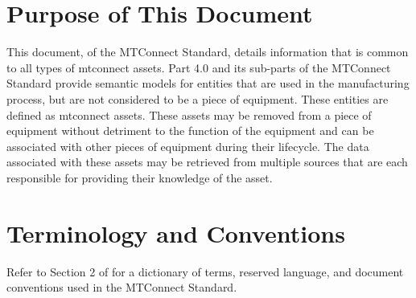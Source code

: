 \section{Purpose of This Document}

This document,  of the MTConnect Standard, details information that is common to all types of \glspl{mtconnect asset}.  Part 4.0 and its sub-parts of the MTConnect Standard provide semantic models for entities that are used in the manufacturing process, but are not considered to be a piece of equipment.  These entities are defined as \glspl{mtconnect asset}.  These \glspl{asset} may be removed from a piece of equipment without detriment to the function of the equipment and can be associated with other pieces of equipment during their lifecycle.  The data associated with these \glspl{asset} may be retrieved from multiple sources that are each responsible for providing their knowledge of the \gls{asset}.

\section{Terminology and Conventions}
Refer to Section 2 of  for a dictionary of terms, reserved language, and document conventions used in the MTConnect Standard.

\printglossary

\printacronyms

\printbibliography[title=MTConnect References,keyword=MTC]

\printbibliography[title=Other References,notkeyword=MTC]